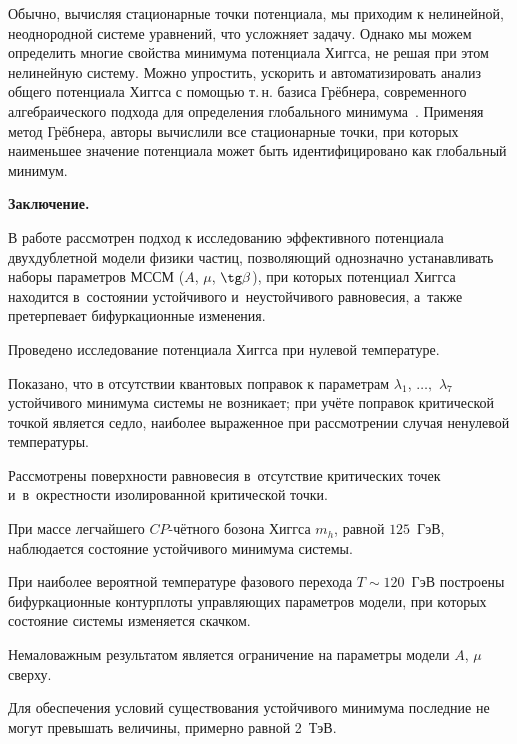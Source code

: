 
Обычно, вычисляя стационарные точки потенциала, мы приходим к нелинейной, неоднородной системе уравнений, что усложняет задачу. Однако мы можем определить многие свойства минимума потенциала Хиггса, не решая при этом нелинейную систему. Можно упростить, ускорить и автоматизировать анализ общего потенциала Хиггса с помощью т.\,н. базиса Грёбнера, современного алгебраического подхода для определения глобального минимума~\cite{arjantsev}. Применяя метод Грёбнера, авторы вычислили все стационарные точки, при которых наименьшее значение потенциала может быть идентифицировано как глобальный минимум.



\smallskip



\textbf{Заключение.}

В работе рассмотрен подход к исследованию эффективного потенциала двухдублетной модели физики частиц, позволяющий однозначно устанавливать наборы параметров МССМ ($A$, $\mu$, $\tg  \beta$), при которых потенциал Хиггса находится в~состоянии устойчивого и~неустойчивого равновесия, а~также претерпевает бифуркационные изменения.



Проведено исследование потенциала Хиггса при нулевой температуре. 

Показано, что в отсутствии квантовых поправок к параметрам $\lambda_1$, $\dots,$ $\lambda_7$ устойчивого минимума системы не возникает; при учёте поправок критической точкой является седло, наиболее выраженное при рассмотрении случая ненулевой температуры.



Рассмотрены поверхности равновесия в~отсутствие критических точек и~в~окрестности изолированной критической точки. 

При массе легчайшего $CP$-чётного бозона Хиггса $m_h$, равной  $125$~ГэВ, наблюдается состояние устойчивого минимума системы.



При наиболее вероятной температуре фазового перехода $T \sim 120$~ГэВ построены бифуркационные контурплоты управляющих параметров модели, при которых состояние системы изменяется скачком. 

Немаловажным результатом является ограничение на параметры модели $A$,  $\mu$ сверху. 

Для обеспечения условий существования устойчивого минимума последние не могут превышать величины, примерно равной 2~ТэВ. 

